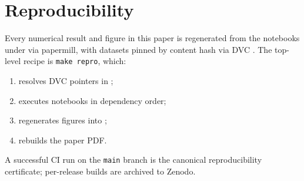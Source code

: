 \section{Reproducibility}
\label{app:repro}

Every numerical result and figure in this paper is regenerated from the
notebooks under  via papermill, with datasets pinned
by content hash via DVC \cite{dvc}. The top-level recipe is
\texttt{make repro}, which:
\begin{enumerate}
  \item resolves DVC pointers in ;
  \item executes notebooks in dependency order;
  \item regenerates figures into ;
  \item rebuilds the paper PDF.
\end{enumerate}
A successful CI run on the \texttt{main} branch is the canonical
reproducibility certificate; per-release builds are archived to
Zenodo.

